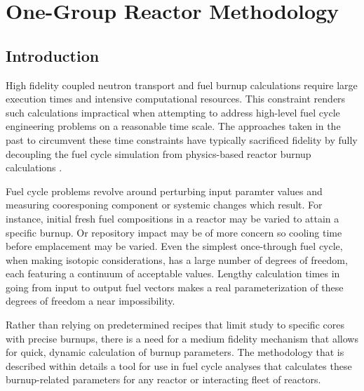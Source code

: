 \chapter{One-Group Reactor Methodology}
\label{1g_paper}



\section{Introduction}
\label{1g_sec:intro}
High fidelity coupled neutron transport and fuel burnup calculations require large execution times
and intensive computational resources.  This constraint renders such calculations impractical when 
attempting to address high-level fuel cycle engineering problems on a reasonable time scale.  
The approaches taken in the past to circumvent these time constraints have typically sacrificed 
fidelity by fully decoupling the fuel cycle simulation from physics-based reactor burnup calculations 
\cite{Jacobson2009}.  

Fuel cycle problems revolve around perturbing input paramter values and measuring cooresponing component or
systemic changes which result. For instance, initial fresh fuel compositions in a reactor may be varied 
to attain a specific 
burnup. Or repository impact may be of more concern so cooling time before emplacement may be varied.  Even 
the simplest once-through fuel cycle, when making isotopic considerations, has a large number of degrees of 
freedom, each 
featuring a continuum of acceptable values.  Lengthy calculation times in going from input to output fuel vectors 
makes a real parameterization of these degrees of freedom a near impossibility.  

Rather than relying on predetermined recipes that limit study to specific cores with precise burnups, 
there is a need for a medium fidelity mechanism that allows for quick, dynamic calculation of burnup 
parameters.  The methodology that is described within details a tool for use in fuel cycle analyses 
that calculates these burnup-related parameters for any reactor or interacting fleet of reactors.


